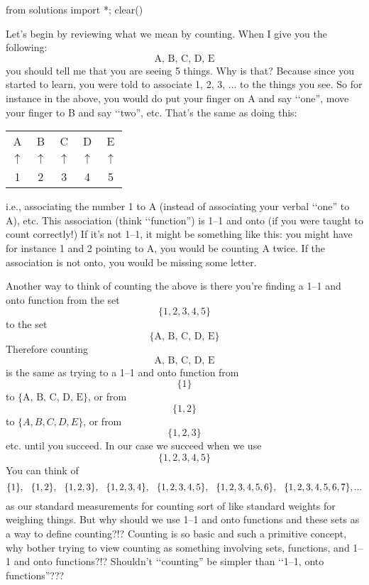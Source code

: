 \begin{python0}
from solutions import *; clear()
\end{python0}

Let's begin by reviewing what we mean by counting.
When I give you the following:
\[
\text{A, B, C, D, E}
\]
you should tell me that you are seeing 5 things.
Why is that? 
Because since you started to learn, you were told to associate
1, 2, 3, ... to the things you see.
So for instance in the above, you would do put your
finger on A and say \lq\lq one'',
move your finger to B and say \lq\lq two'', etc.
That's the same as doing this:
\begin{longtable}{ccccc}
A & B & C & D & E \\
$\uparrow$ & $\uparrow$ & 
$\uparrow$ & 
$\uparrow$ & 
$\uparrow$  \\
1 & 2 & 3 & 4 & 5
\end{longtable}
i.e., associating the number 1 to A (instead of associating your
verbal \lq\lq one'' to A), etc.
This association (think \lq\lq function'') is 1--1 and onto
(if you were taught to count correctly!)
If it's not 1--1, it might be something like this:
you might have for instance 1 and 2 pointing to A,
you would be counting A twice.
If the association is not onto, you would be missing some letter.

Another way to think of counting the above is there you're finding a
1--1 and onto function from the set 
\[
\{1, 2, 3, 4, 5\}
\]
to the set
\[
\{\text{A, B, C, D, E}\}
\]
Therefore counting
\[
\text{A, B, C, D, E}
\]
is the same as trying to a 1--1 and onto function from 
\[
\{1\}
\]
to $\{\text{A, B, C, D, E}\}$, or from 
\[
\{1, 2\}
\]
to $\{A, B, C, D, E\}$, or from 
\[
\{1, 2, 3\}
\] 
etc. until you succeed.
In our case we succeed when we use 
\[
\{1, 2, 3, 4, 5\}
\]
You can think of 
\[
\{1\}, \hspace{0.25cm}
\{1,2\}, \hspace{0.25cm}
\{1,2,3\}, \hspace{0.25cm}
\{1,2,3,4\}, \hspace{0.25cm}
\{1,2,3,4,5\}, \hspace{0.25cm}
\{1,2,3,4,5,6\}, \hspace{0.25cm}
\{1,2,3,4,5,6,7\}, ... 
\]
as our standard measurements for counting
sort of like standard weights for weighing things.
But why should we use 1--1 and onto functions and these sets as
a way to define counting?!?
Counting is so basic and such a primitive concept, why
bother trying to view counting as something involving sets, functions,
and 1--1 and onto functions?!?
Shouldn't \lq\lq counting'' be simpler than \lq\lq 1--1, onto functions''???

